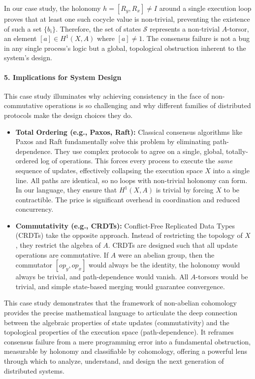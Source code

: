 \documentclass[
]{article}
\begin{document}
In our case study, the holonomy \(h = [R_y, R_x] \neq I\) around a
single execution loop proves that at least one such cocycle value is
non-trivial, preventing the existence of such a set \(\{b_i\}\).
Therefore, the set of states \(\mathcal{S}\) represents a non-trivial
\(A\)-torsor, an element \([a] \in H^1(X, A)\) where \([a] \neq 1\). The
consensus failure is not a bug in any single process's logic but a
global, topological obstruction inherent to the system's design.

\paragraph{5. Implications for System
Design}\label{implications-for-system-design}

This case study illuminates why achieving consistency in the face of
non-commutative operations is so challenging and why different families
of distributed protocols make the design choices they do.

\begin{itemize}
\item
  \textbf{Total Ordering (e.g., Paxos, Raft):} Classical consensus
  algorithms like Paxos and Raft fundamentally solve this problem by
  eliminating path-dependence. They use complex protocols to agree on a
  single, global, totally-ordered log of operations. This forces every
  process to execute the \emph{same} sequence of updates, effectively
  collapsing the execution space \(X\) into a single line. All paths are
  identical, so no loops with non-trivial holonomy can form. In our
  language, they ensure that \(H^1(X, A)\) is trivial by forcing \(X\)
  to be contractible. The price is significant overhead in coordination
  and reduced concurrency.
\item
  \textbf{Commutativity (e.g., CRDTs):} Conflict-Free Replicated Data
  Types (CRDTs) take the opposite approach. Instead of restricting the
  topology of \(X\), they restrict the algebra of \(A\). CRDTs are
  designed such that all update operations are commutative. If \(A\)
  were an abelian group, then the commutator \([op_y, op_x]\) would
  always be the identity, the holonomy would always be trivial, and
  path-dependence would vanish. All \(A\)-torsors would be trivial, and
  simple state-based merging would guarantee convergence.
\end{itemize}

This case study demonstrates that the framework of non-abelian
cohomology provides the precise mathematical language to articulate the
deep connection between the algebraic properties of state updates
(commutativity) and the topological properties of the execution space
(path-dependence). It reframes consensus failure from a mere programming
error into a fundamental obstruction, measurable by holonomy and
classifiable by cohomology, offering a powerful lens through which to
analyze, understand, and design the next generation of distributed
systems.
\end{document}
